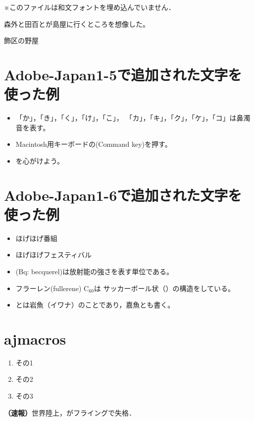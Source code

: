 \documentclass{ltjsarticle}
\begin{document}
※このファイルは和文フォントを埋め込んでいません．

森外と田百とが島屋に行くところを想像した。

飾区の野屋

\section*{Adobe-Japan1-5で追加された文字を使った例}
\begin{itemize}
  \item 「\゜か」，「\゜き」，「\゜く」，「\゜け」，「\゜こ」，
        「\゜カ」，「\゜キ」，「\゜ク」，「\゜ケ」，「\゜コ」は鼻濁音を表す。
  \item Macintosh用キーボードの(Command key)を押す。
  \item {}を心がけよう。
\end{itemize}

\section*{Adobe-Japan1-6で追加された文字を使った例}
\begin{itemize}
  \item ほげほげ番組
  \item ほげほげフェスティバル
  \item {}(Bq: becquerel)は放射能の強さを表す単位である。
  \item フラーレン(fullerene) C$_{60}$は
        サッカーボール状（）の構造をしている。
  \item {}とは岩魚（イワナ）のことであり，嘉魚とも書く。
\end{itemize}

\section*{ajmacros}

\begin{enumerate}\renewcommand{\labelenumi}{\ajLabel\ajKuroKaku{enumi}}
\item その1
\item その2
\item その3
\end{enumerate}

{\bf（速報）}世界陸上，がフライングで失格．


%
\end{document}
